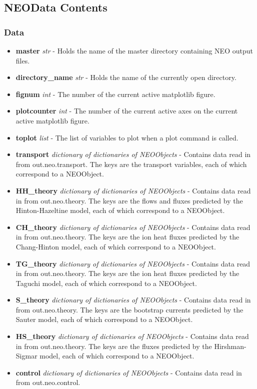 \documentclass{article}
\begin{document}
\subsection{NEOData Contents}
\subsubsection{Data}
\begin{itemize}
\item \textbf{master} \emph{str} - Holds the name of the master directory containing NEO output files.
\item \textbf{directory\_name} \emph{str} - Holds the name of the currently open directory.
\item \textbf{fignum} \emph{int} - The number of the current active matplotlib figure.
\item \textbf{plotcounter} \emph{int} - The number of the current active axes on the current active matplotlib figure.
\item \textbf{toplot} \emph{list} - The list of variables to plot when a plot command is called.
\item \textbf{transport} \emph{dictionary of dictionaries of NEOObjects} - Contains data read in from out.neo.transport.  The keys are the transport variables, each of which correspond to a NEOObject.
\item \textbf{HH\_theory} \emph{dictionary of dictionaries of NEOObjects} - Contains data read in from out.neo.theory.  The keys are the flows and fluxes predicted by the Hinton-Hazeltine model, each of which correspond to a NEOObject.
\item \textbf{CH\_theory} \emph{dictionary of dictionaries of NEOObjects} - Contains data read in from out.neo.theory.  The keys are the ion heat fluxes predicted by the Chang-Hinton model, each of which correspond to a NEOObject.
\item \textbf{TG\_theory} \emph{dictionary of dictionaries of NEOObjects} - Contains data read in from out.neo.theory.  The keys are the ion heat fluxes predicted by the Taguchi model, each of which correspond to a NEOObject.
\item \textbf{S\_theory} \emph{dictionary of dictionaries of NEOObjects} - Contains data read in from out.neo.theory. The keys are the bootstrap currents predicted by the Sauter model, each of which correspond to a NEOObject.
\item \textbf{HS\_theory} \emph{dictionary of dictionaries of NEOObjects} - Contains data read in from out.neo.theory.  The keys are the fluxes predicted by the Hirshman-Sigmar model, each of which  correspond to a NEOObject.
\item \textbf{control} \emph{dictionary of dictionaries of NEOObjects} - Contains data read in from out.neo.control.
\end{itemize}
\end{document}
